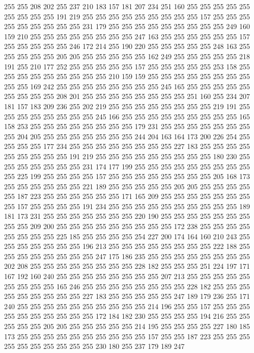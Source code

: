 255 255 208 202 255 237 210 183 157 181 207 234 251 160 255 255 255 255 255 255
255 255 255 191 219 255 255 255 255 255 255 255 255 255 157 255 255 255 255 255
255 255 255 255 231 179 255 255 255 255 255 255 255 255 255 249 160 159 210 255
255 255 255 255 255 255 255 247 163 255 255 255 255 255 255 157 255 255 255 255
255 246 172 214 255 190 220 255 255 255 255 255 248 163 255 255 255 255 255 205
205 255 255 255 255 255 162 249 255 255 255 255 255 218 191 255 210 177 252 255
255 255 255 255 157 255 255 255 255 255 253 158 255 255 255 255 255 255 255 255
255 210 159 159 255 255 255 255 255 255 255 255 255 255 169 242 255 255 255 255
255 255 255 255 245 165 255 255 255 255 255 255 255 255 255 208 201 255 255 255
255 255 255 255 255 251 160 255 234 207 181 157 183 209 236 255 202 219 255 255
255 255 255 255 255 255 219 191 255 255 255 255 255 255 255 255 245 166 255 255
255 255 255 255 255 255 255 165 158 253 255 255 255 255 255 255 255 255 179 231
255 255 255 255 255 255 255 255 204 205 255 255 255 255 255 255 255 244 204 163
164 173 200 226 254 255 255 255 255 177 234 255 255 255 255 255 255 255 255 227
183 255 255 255 255 255 255 255 255 255 191 219 255 255 255 255 255 255 255 255
255 180 230 255 255 255 255 255 255 255 231 174 177 199 255 255 255 255 255 255
255 255 255 255 225 199 255 255 255 255 157 255 255 255 255 255 255 255 255 205
168 173 255 255 255 255 255 255 221 189 255 255 255 255 255 205 205 255 255 255
255 255 187 223 255 255 255 255 255 255 171 165 209 255 255 255 255 255 255 255
255 157 255 255 255 255 191 234 255 255 255 255 255 255 255 255 255 255 189 181
173 231 255 255 255 255 255 255 255 220 190 255 255 255 255 255 255 255 255 255
209 200 255 255 255 255 255 255 255 255 255 172 238 255 255 255 255 255 255 255
255 225 185 255 255 255 255 254 227 200 174 164 160 210 243 255 255 255 255 255
255 255 196 213 255 255 255 255 255 255 255 255 222 188 255 255 255 255 255 255
255 255 247 175 186 235 255 255 255 255 255 255 255 255 202 208 255 255 255 255
255 255 255 255 228 182 255 255 255 251 224 197 171 167 192 160 240 255 255 255
255 255 255 255 255 207 213 255 255 255 255 255 255 255 255 255 165 246 255 255
255 255 255 255 255 255 228 182 255 255 255 255 255 255 255 255 255 227 183 255
255 255 255 255 247 189 179 236 255 171 240 255 255 255 255 255 255 255 255 255
255 214 196 255 255 157 255 255 255 255 255 255 255 255 255 255 172 184 182 230
255 255 255 255 194 216 255 255 255 255 255 205 205 255 255 255 255 255 214 195
255 255 255 255 227 180 185 173 255 255 255 255 255 255 255 255 255 255 157 255
255 187 223 255 255 255 255 255 255 255 255 255 255 230 180 255 237 179 189 247
